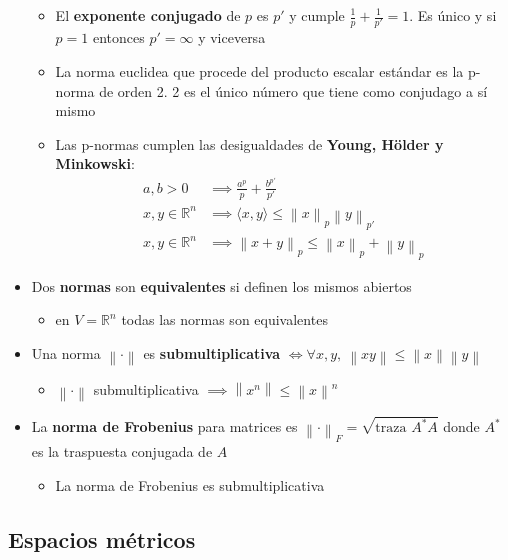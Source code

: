 \documentclass[a4paper,twocolumn]{extarticle}
\newcommand{\R}{\mathbb{R}}
\newcommand{\norma}[1]{\left\lVert#1\right\rVert}
\newcommand{\dotprod}[1]{\langle #1 \rangle}
\newcommand{\tr}{\text{traza }}
\begin{document}
\begin{itemize}
	\begin{itemize}
		\item El \textbf{exponente conjugado} de $p$ es $p'$ y cumple $\frac{1}{p} + \frac{1}{p'} = 1$. Es único y si $p = 1$ entonces $p' = \infty$ y viceversa
		\item La norma euclidea que procede del producto escalar estándar es la p-norma de orden 2. 2 es el único número que tiene como conjudago a sí mismo
		\item Las p-normas cumplen las desigualdades de \textbf{Young, Hölder y Minkowski}:
		\begin{align*}
			a,b > 0 &\implies \frac{a^p}{p} + \frac{b^{p'}}{p'} \\
			x,y \in \R^n &\implies \dotprod{x,y} \leq \norma{x}_p \norma{y}_{p'} \\
			x,y \in \R^n &\implies \norma{x+y}_p \leq \norma{x}_p + \norma{y}_p
		\end{align*}
	\end{itemize}
	\item Dos \textbf{normas} son \textbf{equivalentes} si definen los mismos abiertos
	\begin{itemize}
		\item en $V = \R^n$ todas las normas son equivalentes
	\end{itemize}
	\item Una norma $\norma{\cdot}$ es \textbf{submultiplicativa} $\iff \forall x, y,\ \norma{xy} \leq \norma{x}\norma{y}$
	\begin{itemize}
		\item $\norma{\cdot}$ submultiplicativa $\implies \norma{x^n} \leq \norma{x}^n$
	\end{itemize}
	\item La \textbf{norma de Frobenius} para matrices es $\norma{\cdot}_F = \sqrt{\tr A^\ast A}$ donde $A^\ast$ es la traspuesta conjugada de $A$
	\begin{itemize}
		\item La norma de Frobenius es submultiplicativa
	\end{itemize}
\end{itemize}

\subsection{Espacios métricos}
\end{document}
